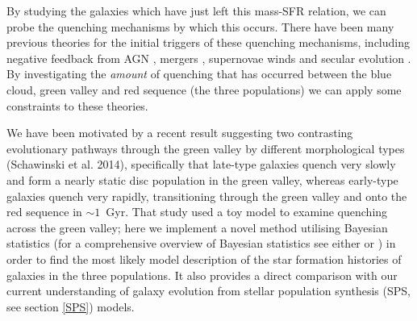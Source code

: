 \documentclass{mn2e}
\begin{document}
By studying the galaxies which  have just left this mass-SFR relation, we can probe the quenching mechanisms by which this occurs. There have been many previous theories for the initial triggers of these quenching mechanisms, including negative feedback from AGN \citep{Sch07}, mergers \citep{Darg10a}, supernovae winds \citep{MFB12} and secular evolution \citep{Masters10, Masters11}. By investigating the \emph{amount} of quenching that has occurred between the blue cloud, green valley and red sequence (the three populations) we can apply some constraints to these theories. 

We have been motivated by a recent result suggesting two contrasting evolutionary pathways through the green valley by different morphological types (Schawinski et al. 2014), specifically that late-type galaxies quench very slowly and form a nearly static disc population in the green valley, whereas early-type galaxies quench very rapidly, transitioning through the green valley and onto the red sequence in $\sim 1$~Gyr. That study used a toy model to examine quenching across the green valley; here we implement a novel method utilising Bayesian statistics (for a comprehensive overview of Bayesian statistics see either \citealt{MacKay} or \citealt{Sivia}) in order to find the most likely model description of the star formation histories of galaxies in the three populations. It also provides a direct comparison with our current understanding of galaxy evolution from stellar population synthesis (SPS, see section \ref{SPS}) models. 

\end{document}
